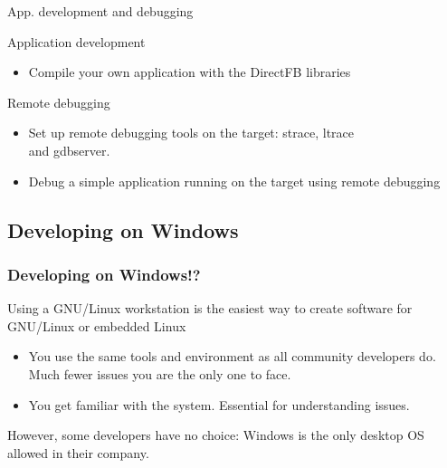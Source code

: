 \setuplabframe
{App. development and debugging}
{
  Application development
  \begin{itemize}
  \item Compile your own application with the DirectFB libraries
  \end{itemize}
  Remote debugging
  \begin{itemize}
  \item Set up remote debugging tools on the target: strace, ltrace\\
    and gdbserver.
  \item Debug a simple application running on the target using remote
    debugging
  \end{itemize}
}

\subsection{Developing on Windows}

\begin{frame}
  \frametitle{Developing on Windows!?}
  Using a GNU/Linux workstation is the easiest way to create software
  for GNU/Linux or embedded Linux
  \begin{itemize}
  \item You use the same tools and environment as all community
    developers do.  Much fewer issues you are the only one to face.
  \item You get familiar with the system.  Essential for understanding
    issues.
  \end{itemize}
  However, some developers have no choice: Windows is the only desktop
  OS allowed in their company.
\end{frame}

